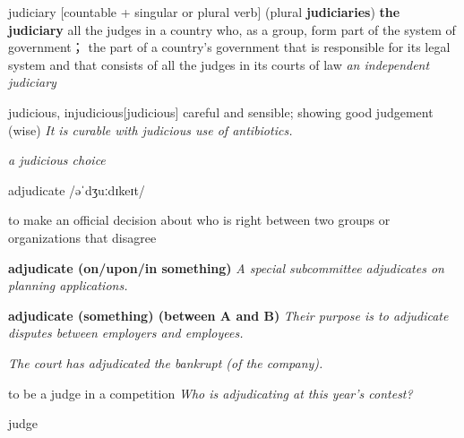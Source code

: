 \begin{DefWord}{judiciary}
    [countable + singular or plural verb]
    (plural \textbf{judiciaries})
    \textbf{the judiciary}
    all the judges in a country who, as a group, form part of the system of government； the part of a country's government that is responsible for its legal system and that consists of all the judges in its courts of law
    \textit{an independent judiciary}
\end{DefWord}

\begin{DefWord}{judicious, injudicious}[judicious]
    careful and sensible; showing good judgement (wise)
    \textit{It is curable with judicious use of antibiotics.}

    \textit{a judicious choice}
\end{DefWord}

\begin{DefWord}{adjudicate}
    /əˈdʒuːdɪkeɪt/

    to make an official decision about who is right between two groups or organizations that disagree

    \textbf{adjudicate (on/upon/in something)} \textit{A special subcommittee adjudicates on planning applications.}

    \textbf{adjudicate (something) (between A and B)} \textit{Their purpose is to adjudicate disputes between employers and employees.}

    \textit{The court has adjudicated the bankrupt (of the company).}

    to be a judge in a competition
    \textit{Who is adjudicating at this year's contest?}


\end{DefWord}

\begin{DefWord}{judge}
\end{DefWord}

